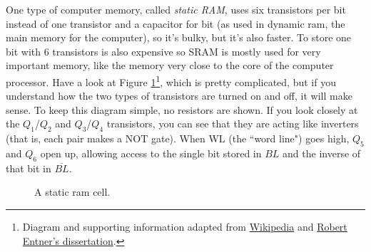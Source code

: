 One type of computer memory, called \emph{static RAM}, uses six transistors per bit instead of one transistor and a capacitor for bit (as used in dynamic ram, the main memory for the computer), so it's bulky, but it's also faster. To store one bit with 6 transistors is also expensive so SRAM is mostly used for very important memory, like the memory very close to the core of the computer processor. Have a look at Figure \ref{fig:sram}\footnote{Diagram and supporting information adapted from {\color{webblue}\href{https://en.wikipedia.org/wiki/Static_random-access_memory}{Wikipedia}} and {\color{webblue}\href{https://www.entner.net/sites/default/files/diss-entner-final-v1.pdf}{Robert Entner's dissertation}}.}, 
which is pretty complicated, but if you understand how the two types of transistors are turned on and off, it will make sense. To keep this diagram simple, no resistors are shown. If you look closely at the $Q_1$/$Q_2$ and $Q_3$/$Q_4$ transistors, you can see that they are acting like inverters (that is, each pair makes a NOT gate). When WL (the ``word line") goes high, $Q_5$ and $Q_6$ open up, allowing access to the single bit stored in $BL$ and the inverse of that bit in $\overline{BL}$. 


\begin{figure}[h!]
\begin{center}

\caption{A static ram cell.} 
\label{fig:sram}
\end{center}
\end{figure}

